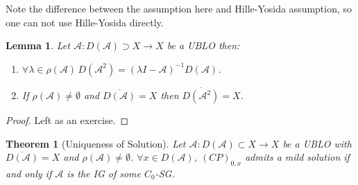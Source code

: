 \documentclass[12pt, oneside]{book}
\newtheorem{lemma}{Lemma}[section]
\newtheorem{theo}{Theorem}[section]
\newcommand{\A}{\mathscr{A}}
\begin{document}
Note the difference between the assumption here and Hille-Yosida assumption, so one can not use Hille-Yosida directly.

\begin{lemma} \label{app:sol:dense}
	Let $\A: D(\A) \supset X \to X$ be a UBLO then:
	\begin{enumerate}
		\item $\forall{\lambda} \in \rho(\A)\, D(\A^2) = \left(\lambda I - \A\right)^{-1} D(\A)$.
		\item If $\rho(\A) \neq \emptyset$ and $\overline{D(\A)} = X$ then $\overline{D(\A^2)} = X$.
	\end{enumerate}
\end{lemma}

\begin{proof}
	Left as an exercise.
\end{proof}

\begin{theo}[Uniqueness of Solution]
	Let $\A: D(\A)\subset X \to X$ be a UBLO with ${\overline{D(\A)} = X}$ and $\rho(\A) \neq \emptyset$. $\forall x \in D(\A)$, $(CP)_{0,x}$ admits a mild solution if and only if $\A$ is the IG of some $C_0$-SG.
\end{theo}
\end{document}
